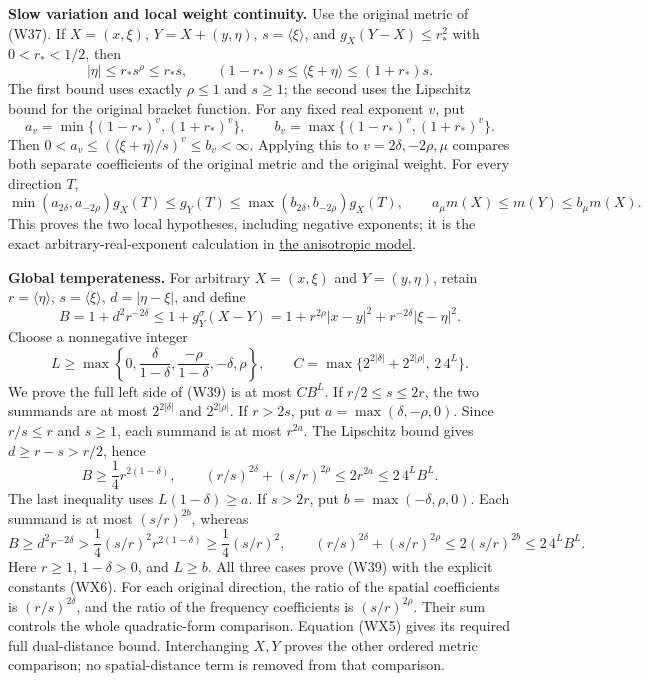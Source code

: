 \documentclass[
  11pt,
]{article}
\begin{document}
\textbf{Slow variation and local weight continuity.} Use the original
metric of (W37). If \(X=(x,\xi)\), \(Y=X+(y,\eta)\),
\(s=\langle\xi\rangle\), and \(g_X(Y-X)\leq r_*^2\) with \(0<r_*<1/2\),
then \[
 |\eta|\leq r_*s^\rho\leq r_*s,\qquad
 (1-r_*)s\leq\langle\xi+\eta\rangle\leq(1+r_*)s.
 \tag{WX2}
\] The first bound uses exactly \(\rho\leq1\) and \(s\geq1\); the second
uses the Lipschitz bound for the original bracket function. For any
fixed real exponent \(v\), put \[
 a_v=\min\{(1-r_*)^v,(1+r_*)^v\},\qquad
 b_v=\max\{(1-r_*)^v,(1+r_*)^v\}.
 \tag{WX3}
\] Then \(0<a_v\leq(\langle\xi+\eta\rangle/s)^v\leq b_v<\infty\).
Applying this to \(v=2\delta,-2\rho,\mu\) compares both separate
coefficients of the original metric and the original weight. For every
direction \(T\), \[
 \min(a_{2\delta},a_{-2\rho})g_X(T)
 \leq g_Y(T)\leq
 \max(b_{2\delta},b_{-2\rho})g_X(T),\qquad
 a_\mu m(X)\leq m(Y)\leq b_\mu m(X).
 \tag{WX4}
\] This proves the two local hypotheses, including negative exponents;
it is the exact arbitrary-real-exponent calculation in
\href{metric-localization.pdf\#section*.29}{the anisotropic
model}.

\textbf{Global temperateness.} For arbitrary \(X=(x,\xi)\) and
\(Y=(y,\eta)\), retain \(r=\langle\eta\rangle\),
\(s=\langle\xi\rangle\), \(d=|\eta-\xi|\), and define \[
 B=1+d^2r^{-2\delta}
 \leq 1+g_Y^\sigma(X-Y)
 =1+r^{2\rho}|x-y|^2+r^{-2\delta}|\xi-\eta|^2.
 \tag{WX5}
\] Choose a nonnegative integer \[
 L\geq\max\left\{0,\frac{\delta}{1-\delta},
                    \frac{-\rho}{1-\delta},-\delta,\rho\right\},
 \qquad
 C=\max\{2^{2|\delta|}+2^{2|\rho|},\,2\,4^L\}.
 \tag{WX6}
\] We prove the full left side of (W39) is at most \(CB^L\). If
\(r/2\leq s\leq2r\), the two summands are at most \(2^{2|\delta|}\) and
\(2^{2|\rho|}\). If \(r>2s\), put \(a=\max(\delta,-\rho,0)\). Since
\(r/s\leq r\) and \(s\geq1\), each summand is at most \(r^{2a}\). The
Lipschitz bound gives \(d\geq r-s>r/2\), hence \[
 B\geq\frac14r^{2(1-\delta)},\qquad
 (r/s)^{2\delta}+(s/r)^{2\rho}
 \leq2r^{2a}\leq2\,4^LB^L.
 \tag{WX7}
\] The last inequality uses \(L(1-\delta)\geq a\). If \(s>2r\), put
\(b=\max(-\delta,\rho,0)\). Each summand is at most \((s/r)^{2b}\),
whereas \[
 B\geq d^2r^{-2\delta}>
       \frac14(s/r)^2r^{2(1-\delta)}
 \geq\frac14(s/r)^2,\qquad
 (r/s)^{2\delta}+(s/r)^{2\rho}
 \leq2(s/r)^{2b}\leq2\,4^LB^L.
 \tag{WX8}
\] Here \(r\geq1\), \(1-\delta>0\), and \(L\geq b\). All three cases
prove (W39) with the explicit constants (WX6). For each original
direction, the ratio of the spatial coefficients is \((r/s)^{2\delta}\),
and the ratio of the frequency coefficients is \((s/r)^{2\rho}\). Their
sum controls the whole quadratic-form comparison. Equation (WX5) gives
its required full dual-distance bound. Interchanging \(X,Y\) proves the
other ordered metric comparison; no spatial-distance term is removed
from that comparison.
\end{document}
